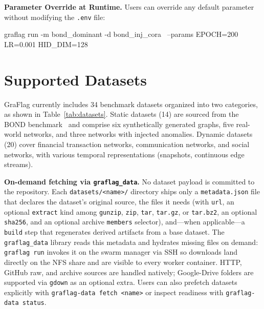 \documentclass[twoside,11pt]{article}
\begin{document}
\textbf{Parameter Override at Runtime.} Users can override any default parameter without modifying the \texttt{.env} file:
\begin{codebox}
graflag run -m bond_dominant -d bond_inj_cora \
    --params EPOCH=200 LR=0.001 HID_DIM=128
\end{codebox}

\section{Supported Datasets}
\label{app:datasets}

GraFlag currently includes 34 benchmark datasets organized into two categories, as shown in Table~\ref{tab:datasets}. Static datasets (14) are sourced from the BOND benchmark~\citep{liu2022bond} and comprise six synthetically generated graphs, five real-world networks, and three networks with injected anomalies. Dynamic datasets (20) cover financial transaction networks, communication networks, and social networks, with various temporal representations (snapshots, continuous edge streams).

\textbf{On-demand fetching via \texttt{graflag\_data}.} No dataset payload is committed to the repository. Each \texttt{datasets/<name>/} directory ships only a \texttt{metadata.json} file that declares the dataset's original source, the files it needs (with \texttt{url}, an optional \texttt{extract} kind among \texttt{gunzip}, \texttt{zip}, \texttt{tar}, \texttt{tar.gz}, or \texttt{tar.bz2}, an optional \texttt{sha256}, and an optional archive \texttt{members} selector), and---when applicable---a \texttt{build} step that regenerates derived artifacts from a base dataset. The \texttt{graflag\_data} library reads this metadata and hydrates missing files on demand: \texttt{graflag~run} invokes it on the swarm manager via SSH so downloads land directly on the NFS share and are visible to every worker container. HTTP, GitHub raw, and archive sources are handled natively; Google-Drive folders are supported via \texttt{gdown} as an optional extra. Users can also prefetch datasets explicitly with \texttt{graflag-data fetch <name>} or inspect readiness with \texttt{graflag-data status}.
\end{document}
